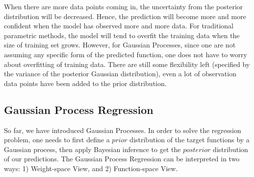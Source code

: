 \documentclass[11pt,a4paper]{article}
\theoremstyle{definition}
\numberwithin{equation}{section}
\begin{document}
	When there are more data points coming in, the uncertainty from the posterior distribution will be decreased. Hence, the prediction will become more and more confident when the model has observed more and more data. For traditional parametric methods, the model will tend to overfit the training data when the size of training set grows. However, for Gaussian Processes, since one are not assuming any specific form of the predicted function, one does not have to worry about overfitting of training data. There are still some flexibility left (specified by the variance of the posterior Gaussian distribution), even a lot of observation data points have been added to the prior distribution. 
	
	\subsection{Gaussian Process Regression}
	So far, we have introduced Gaussian Processes. In order to solve the regression problem, one needs to first define a $prior$ distribution of the target functions by a Gaussian process, then apply Bayesian inference to get the $posterior$ distribution of our predictions. The Gaussian Process Regression can be interpreted in two ways: 1) Weight-space View, and 2) Function-space View.
	
\end{document}
